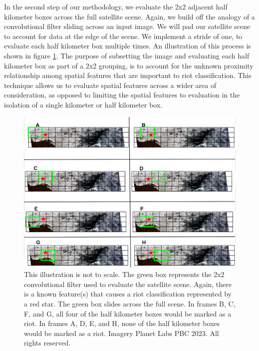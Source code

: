 In the second step of our methodology, we evaluate the 2x2 adjacent half kilometer boxes across the full satellite scene.  Again, we build off the analogy of a convolutional filter sliding across an input image.  We will pad our satellite scene to account for data at the edge of the scene.  We implement a stride of one, to evaluate each half kilometer box multiple times.  An illustration of this process is shown in figure \ref{fig:eval_paper3}.  The purpose of subsetting the image and evaluating each half kilometer box as part of a 2x2 grouping, is to account for the unknown proximity relationship among spatial features that are important to riot classification.  This technique allows us to evaluate spatial features across a wider area of consideration, as opposed to limiting the spatial features to evaluation in the isolation of a single kilometer or half kilometer box. 

\begin{figure}
    \centering
    \includegraphics[width=1\linewidth]{Figures/eval_frames.png}
    \caption{This illustration is not to scale.  The green box represents the 2x2 convolutional filter used to evaluate the satellite scene.  Again, there is a known feature(s) that causes a riot classification represented by a red star.  The green box slides across the full scene.  In frames B, C, F, and G, all four of the half kilometer boxes would be marked as a riot.  In frames A, D, E, and H, none of the half kilometer boxes would be marked as a riot.  Imagery \textcopyright Planet Labs PBC 2023. All rights reserved.}
    \label{fig:eval_paper3}
\end{figure}

